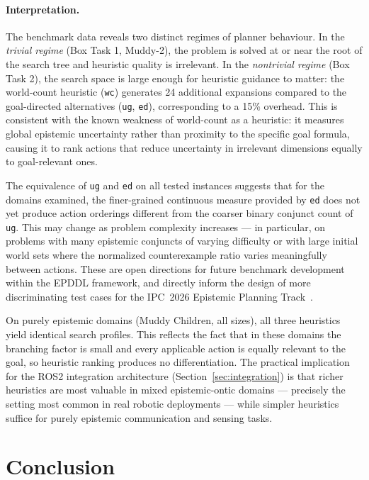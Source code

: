 \documentclass[12pt,a4paper]{article}
\theoremstyle{definition}
\theoremstyle{plain}
\begin{document}
\paragraph{Interpretation.}
The benchmark data reveals two distinct regimes of planner behaviour. In the
\emph{trivial regime} (Box Task 1, Muddy-2), the problem is solved at or near the root
of the search tree and heuristic quality is irrelevant. In the \emph{nontrivial regime}
(Box Task 2), the search space is large enough for heuristic guidance to matter: the
world-count heuristic (\texttt{wc}) generates 24 additional expansions compared to the
goal-directed alternatives (\texttt{ug}, \texttt{ed}), corresponding to a 15\% overhead.
This is consistent with the known weakness of world-count as a heuristic: it measures
global epistemic uncertainty rather than proximity to the specific goal formula, causing
it to rank actions that reduce uncertainty in irrelevant dimensions equally to
goal-relevant ones.

The equivalence of \texttt{ug} and \texttt{ed} on all tested instances suggests that for
the domains examined, the finer-grained continuous measure provided by \texttt{ed} does
not yet produce action orderings different from the coarser binary conjunct count of
\texttt{ug}. This may change as problem complexity increases — in particular, on problems
with many epistemic conjuncts of varying difficulty or with large initial world sets where
the normalized counterexample ratio varies meaningfully between actions. These are open
directions for future benchmark development within the EPDDL framework, and directly
inform the design of more discriminating test cases for the IPC~2026 Epistemic Planning
Track~\cite{burigana2026epddl}.

On purely epistemic domains (Muddy Children, all sizes), all three heuristics yield
identical search profiles. This reflects the fact that in these domains the branching
factor is small and every applicable action is equally relevant to the goal, so
heuristic ranking produces no differentiation. The practical implication for the ROS2
integration architecture (Section~\ref{sec:integration}) is that richer heuristics are
most valuable in mixed epistemic-ontic domains — precisely the setting most common in
real robotic deployments — while simpler heuristics suffice for purely epistemic
communication and sensing tasks.


\newpage
\section{Conclusion}
\label{sec:conclusion}
\end{document}
